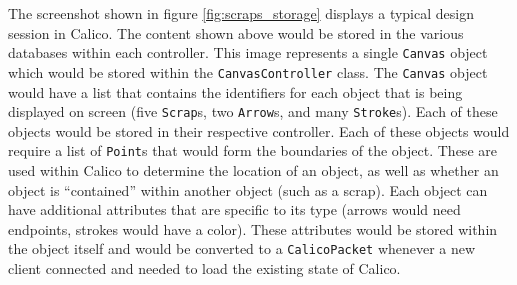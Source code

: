 The screenshot shown in figure \ref{fig:scraps_storage} displays a typical design session in Calico. The content shown above would be stored in the various databases within each controller. This image represents a single \texttt{Canvas} object which would be stored within the \texttt{CanvasController} class. The \texttt{Canvas} object would have a list that contains the identifiers for each object that is being displayed on screen (five \texttt{Scrap}s, two \texttt{Arrow}s, and many \texttt{Stroke}s). Each of these objects would be stored in their respective controller. Each of these objects would require a list of \texttt{Point}s that would form the boundaries of the object. These are used within Calico to determine the location of an object, as well as whether an object is ``contained'' within another object (such as a scrap). Each object can have additional attributes that are specific to its type (arrows would need endpoints, strokes would have a color). These attributes would be stored within the object itself and would be converted to a \texttt{CalicoPacket} whenever a new client connected and needed to load the existing state of Calico.








% 